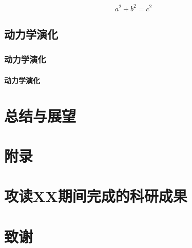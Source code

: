 \documentclass{YNUthesis}
\begin{document}
\zhlipsum

\[
	a^2+b^2=c^2
\]

\zhlipsum

\section{动力学演化}
\zhlipsum

\subsection{动力学演化}
\zhlipsum

\subsubsection{动力学演化}
\zhlipsum

\chapter{总结与展望}
\zhlipsum

\appendix
\chapter{附录}
\zhlipsum

\backmatter

\printbibliography

\chapter{攻读XX期间完成的科研成果}
\zhlipsum

\chapter{致谢}
\zhlipsum
\end{document}
